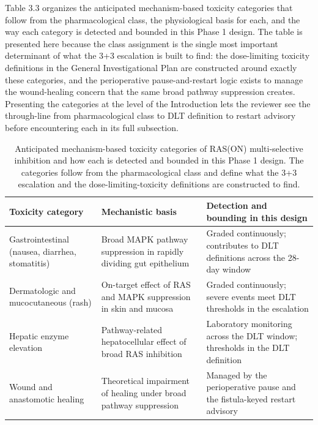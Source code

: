 Table 3.3 organizes the anticipated mechanism-based toxicity categories that follow
from the pharmacological class, the physiological basis for each, and the way each
category is detected and bounded in this Phase 1 design. The table is presented here
because the class assignment is the single most important determinant of what the
3+3 escalation is built to find: the dose-limiting toxicity definitions in the
General Investigational Plan are constructed around exactly these categories, and the
perioperative pause-and-restart logic exists to manage the wound-healing concern that
the same broad pathway suppression creates. Presenting the categories at the level of
the Introduction lets the reviewer see the through-line from pharmacological class to
DLT definition to restart advisory before encountering each in its full subsection.

\begin{table}[t]
\caption{Anticipated mechanism-based toxicity categories of RAS(ON) multi-selective
inhibition and how each is detected and bounded in this Phase 1 design. The
categories follow from the pharmacological class and define what the 3+3 escalation
and the dose-limiting-toxicity definitions are constructed to find.}
\label{tab:sec02-toxcat}
\centering
\begin{tabularx}{\textwidth}{L{3.6cm} Y Y}
\toprule
\textbf{Toxicity category} & \textbf{Mechanistic basis} & \textbf{Detection and bounding in this design} \\
\midrule
Gastrointestinal (nausea, diarrhea, stomatitis) & Broad MAPK pathway suppression in rapidly dividing gut epithelium & Graded continuously; contributes to DLT definitions across the 28-day window \\
Dermatologic and mucocutaneous (rash) & On-target effect of RAS and MAPK suppression in skin and mucosa & Graded continuously; severe events meet DLT thresholds in the escalation \\
Hepatic enzyme elevation & Pathway-related hepatocellular effect of broad RAS inhibition & Laboratory monitoring across the DLT window; thresholds in the DLT definition \\
Wound and anastomotic healing & Theoretical impairment of healing under broad pathway suppression & Managed by the perioperative pause and the fistula-keyed restart advisory \\
\bottomrule
\end{tabularx}
\end{table}
\vspace*{-1.4cm}

